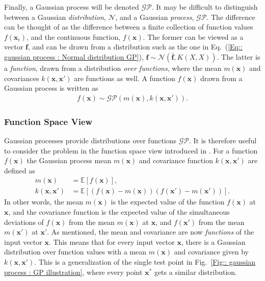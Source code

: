 \documentclass[twoside,english]{uiofysmaster}
\begin{document}
Finally, a Gaussian process will be denoted $\mathcal{GP}$. It may be difficult to distinguish between a Gaussian \textit{distribution}, $\mathcal{N}$, and a Gaussian \textit{process}, $\mathcal{GP}$. The difference can be thought of as the difference between a finite collection of function values $f(\textbf{x}_i)$, and the continuous function, $f(\textbf{x})$. The former can be viewed as a vector $\textbf{f}$, and can be drawn from a distribution such as the one in Eq.~(\ref{Eq:: gaussian process : Normal distribution GP}), $\textbf{f} \sim \mathcal{N}(\bar{ \textbf{f} }, K(X, X))$. The latter is a \textit{function}, drawn from a distribution \textit{over functions}, where the mean $m(\textbf{x})$ and covariances $k(\textbf{x}, \textbf{x}')$ are functions as well. A function $f(\textbf{x})$ drawn from a Gaussian process is written as 
\begin{align}
f(\textbf{x}) \sim \mathcal{GP} (m(\textbf{x}), k(\textbf{x}, \textbf{x}')).
\end{align}

\subsubsection{Function Space View}

Gaussian processes provide distributions over functions $\mathcal{GP}$. It is therefore useful to consider the problem in the function space view introduced in \cite{rasmussen2006gaussian}. For a function $f(\textbf{x})$ the Gaussian process mean $m(\textbf{x})$ and covariance function $k(\textbf{x}, \textbf{x}')$ are defined as
\begin{align}
m(\textbf{x}) &= \mathbb{E}[f(\textbf{x})],\\
k(\textbf{x}, \textbf{x}') &= \mathbb{E} [(f(\textbf{x}) - m(\textbf{x}))(f(\textbf{x}') - m(\textbf{x}'))].
\end{align}
In other words, the mean $m(\textbf{x})$ is the expected value of the function $f(\textbf{x})$ at $\textbf{x}$, and the covariance function is the expected value of the simultaneous deviations of $f(\textbf{x})$ from the mean $m(\textbf{x})$ at $\textbf{x}$, and $f(\textbf{x}')$ from the mean $m(\textbf{x}')$ at $\textbf{x}'$. As mentioned, the mean and covariance are now \textit{functions} of the input vector $\textbf{x}$. This means that for every input vector $\textbf{x}$, there is a Gaussian distribution over function values with a mean $m(\textbf{x})$ and covariance given by $k(\textbf{x}, \textbf{x}')$. This is a generalization of the single test point in Fig.~\ref{Fig:: gaussian process : GP illustration}, where every point $\textbf{x}^*$ gets a similar distribution.
\end{document}
